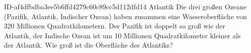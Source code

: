 \begin{exercise}
      {ID-af4dfbdba3ee5b6ffd4279c60c89cc5d112dfd14}
      {Atlantik}
  \ifproblem\problem
    Die drei großen Ozeane (Pazifik, Atlantik, Indischer Ozean) haben
    zusammen eine Wasseroberfläche von 320 Millionen Quadratkilometern.
    Der Pazifik ist doppelt so groß wie der Atlantik, der Indische Ozean
    ist um 10 Millionen Quadratkilometer kleiner als der Atlantik.
    Wie groß ist die Oberfläche des Atlantiks?
  \fi
\end{exercise}
